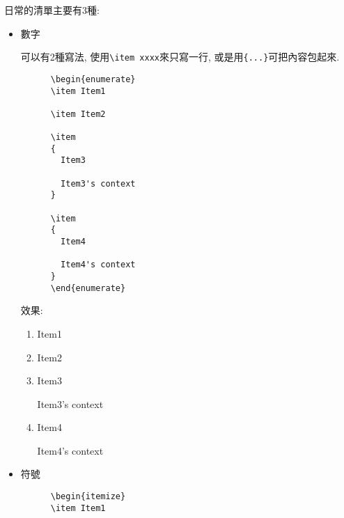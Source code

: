 
  日常的清單主要有3種:

\begin{itemize}
  \item
  {
    數字

    可以有2種寫法, 使用\verb|\item xxxx|來只寫一行, 或是用\verb|{...}|可把內容包起來.
    \EmptyLine
    \begin{fmpage}{\textwidth}
    \begin{verbatim}
      \begin{enumerate}
      \item Item1

      \item Item2

      \item
      {
        Item3

        Item3's context
      }

      \item
      {
        Item4

        Item4's context
      }
      \end{enumerate}
    \end{verbatim}
    \end{fmpage}
    \EmptyLine

    效果:
    \begin{enumerate}
      \item Item1

      \item Item2

      \item
      {
        Item3

        Item3's context
      }

      \item
      {
        Item4

        Item4's context
      }
    \end{enumerate}
  } %

  \newpage
  \item
  {
    符號

    \EmptyLine
    \begin{fmpage}{\textwidth}
    \begin{verbatim}
      \begin{itemize}
      \item Item1


\end{verbatim}
\end{fmpage}}
\end{itemize}
